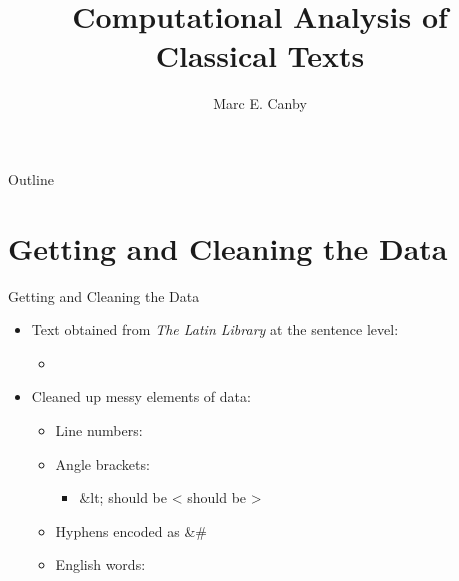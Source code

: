 \documentclass{beamer}
\title{Computational Analysis of Classical Texts}
\author{Marc E. Canby}
\institute[] %
{
	\inst{}%
	Lati 318 $-$ Cicero: \textit{De Re Publica}\\
	Rice University

}
\date{}
\begin{document}
\begin{frame}
\titlepage
\end{frame}

\begin{frame}{Outline}
\tableofcontents
\end{frame}

\section{Getting and Cleaning the Data}

\begin{frame}{Getting and Cleaning the Data}


\begin{itemize}
	\setlength\itemsep{1em}
	\item Text obtained from \textit{The Latin Library} at the sentence level:
	\begin{itemize}
		\item {}
	\end{itemize}
\item Cleaned up messy elements of data:
\begin{itemize}
	\setlength\itemsep{0.5em}
	\item Line numbers: {\ttfamily [1,2,...,71]}
	\item Angle brackets: {}
	\begin{itemize}
		\item {\ttfamily \&lt;} should be {\ttfamily <}  should be {\ttfamily >}
	\end{itemize}
\item Hyphens encoded as {\ttfamily \&\#}
\item English words: {}
\end{itemize}
\end{itemize}

\end{frame}
\end{document}
